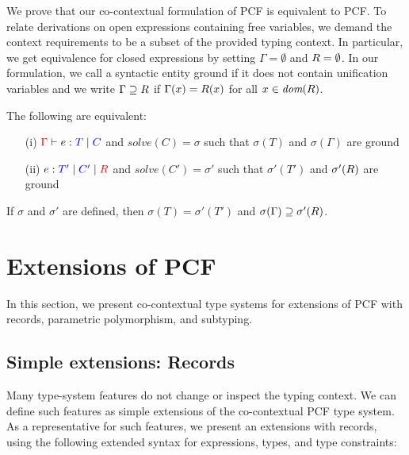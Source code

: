 \documentclass{llncs}
\begin{document}
We prove that our co-contextual formulation of PCF is equivalent to PCF. To
relate derivations on open expressions containing free variables, we demand the
context requirements to be a subset of the provided typing context. In
particular, we get equivalence for closed expressions by setting
$\Gamma=\emptyset$ and $R=\emptyset$. In our formulation, we call a
syntactic entity ground if it does not contain unification variables and we write $\Gamma \supseteq R$ if $\Gamma(x) = R(x)$
for all $x \in \textit{dom}(R)$.
%
\begin{theorem} 
\label{thm:equiv}
The following are equivalent:
\vspace{-1ex}
\begin{enumerate}
\item[(i)] $\judgeC{\Gamma}{e}{T}{C}$ and
  $\mathit{solve}(C)=\sigma$ such that $\sigma(T)$ and $\sigma(\Gamma)$ are ground
\item[(ii)] $\cojudge{e}{T'}{C'}{\reqs}$ and
  $\mathit{solve}(C')=\sigma'$ such that $\sigma'(T') $ and $\sigma'(R)$ are ground
\end{enumerate}
\vspace{-1ex}
  If $\sigma$ and $\sigma'$ are defined, then $\sigma(T) = \sigma'(T')$ and
  $\sigma(\Gamma) \supseteq \sigma'(R)$.
\end{theorem}

\section{Extensions of PCF}
\label{sec:extensions}

In this section, 
we present co-contextual type
systems for extensions of PCF with records, parametric polymorphism, and
subtyping.

\subsection{Simple extensions: Records}
\label{sec:records}

Many type-system features do not change or inspect the typing context. We can
define such features as simple extensions of the co-contextual PCF type
system. As a representative for such features, we present an extensions with records, using the
following extended syntax for expressions, types, and type constraints:
\end{document}
